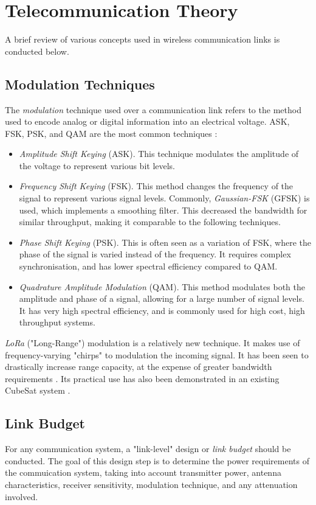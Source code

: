 \section{Telecommunication Theory}\label{sec:telecommunication_theory}
A brief review of various concepts used in wireless communication links is conducted below.

\subsection{Modulation Techniques}
The \textit{modulation} technique used over a communication link refers to the method used to encode analog or digital information into an electrical voltage. ASK, FSK, PSK, and QAM are the most common techniques \cite{site-satelliteModulationOverview} \cite{site-satelliteModulationComparison}:
\begin{itemize}
    \item \textit{Amplitude Shift Keying} (ASK). This technique modulates the amplitude of the voltage to represent various bit levels.
    \item \textit{Frequency Shift Keying} (FSK). This method changes the frequency of the signal to represent various signal levels. Commonly, \textit{Gaussian-FSK} (GFSK) is used, which implements a smoothing filter. This decreased the bandwidth for similar throughput, making it comparable to the following techniques.
    \item \textit{Phase Shift Keying} (PSK). This is often seen as a variation of FSK, where the phase of the signal is varied instead of the frequency. It requires complex synchronisation, and has lower spectral efficiency compared to QAM.
    \item \textit{Quadrature Amplitude Modulation} (QAM). This method modulates both the amplitude and phase of a signal, allowing for a large number of signal levels. It has very high spectral efficiency, and is commonly used for high cost, high throughput systems.
\end{itemize}

\textit{LoRa} ("Long-Range") modulation is a relatively new technique. It makes use of frequency-varying "chirps" to modulation the incoming signal. It has been seen to drastically increase range capacity, at the expense of greater bandwidth requirements \cite{datasheet-SX1278}. Its practical use has also been demonstrated in an existing CubeSat system \cite{design-FOSSASATLink}.

\newpage
\subsection{Link Budget}\label{sec:link_budget}
For any communication system, a "link-level" design or \textit{link budget} should be conducted. The goal of this design step is to determine the power requirements of the commuication system, taking into account transmitter power, antenna characteristics, receiver sensitivity, modulation technique, and any attenuation involved.

